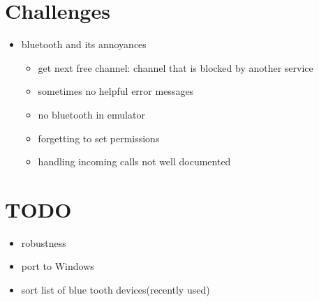 \documentclass[ddc nogerman]{tudbeamer}
\begin{document}
\section{Challenges}
\begin{frame}
    \begin{itemize}
        \item bluetooth and its annoyances
        \begin{itemize}
        	\item get next free channel: channel that is blocked by another service
        	\item sometimes no helpful error messages
            \item no bluetooth in emulator
            \item forgetting to set permissions
            \item handling incoming calls not well documented
        \end{itemize}
    \end{itemize}
\end{frame}

\section{TODO}
\begin{frame}
    \begin{itemize}
        \item robustness
        \item port to Windows
        \item sort list of blue tooth devices(recently used)
    \end{itemize}
\end{frame}
\end{document}
